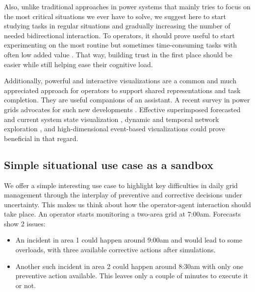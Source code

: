 \documentclass{IOS-Book-Article}
\begin{document}
Also, unlike traditional approaches in power systems that mainly tries to focus on the most critical situations we ever have to solve, we suggest here to start studying tasks in regular situations and gradually increasing the number of needed bidirectional interaction. To operators, it should prove useful to start experimenting on the most routine but sometimes time-consuming tasks with often low added value \cite{endsley2018level}. That way, building trust in the first place should be easier while still helping ease their cognitive load.

Additionally, powerful and interactive visualizations are a common and much appreciated approach for operators to support shared representations and task completion. They are useful companions of an assistant. A recent survey in power grids advocates for such new developments 
\cite{fischer2021towards}. Effective superimposed forecasted and current system state visualization \cite{prouzeau2016towards}, dynamic and temporal network exploration \cite{bach2013graphdiaries,bach2015networkcube}, and high-dimensional event-based visualizations \cite{fouse2011chronoviz} could prove beneficial in that regard.

\subsection{Simple situational use case as a sandbox}
\label{sec:use_case_example}
We offer a simple interesting use case to highlight key difficulties in daily grid management through the interplay of preventive and corrective decisions under uncertainty. This makes us think about how the operator-agent interaction should take place.
An operator starts monitoring a two-area grid at 7:00am. Forecasts show 2 issues:
\begin{itemize}
    \item An incident in area 1 could happen around 9:00am and would lead to some overloads, with three available corrective actions after simulations.%
    \item Another such incident in area 2 could happen around 8:30am with only one preventive action available. This leaves only a couple of minutes to execute it or not.
\end{itemize}
\end{document}
